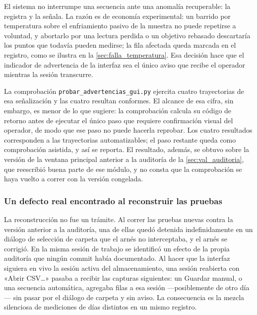 El sistema no interrumpe una secuencia ante una anomalía recuperable:
la registra y la señala. La razón es de economía experimental: un
barrido por temperatura sobre el enfriamiento pasivo de la muestra no
puede repetirse a voluntad, y abortarlo por una lectura perdida o un
objetivo rebasado descartaría los puntos que todavía pueden medirse;
la fila afectada queda marcada en el registro, como se ilustra en la
\cref{sec:falla_temperatura}. Esa decisión hace que el indicador de
advertencia de la interfaz sea el único aviso que recibe el operador
mientras la sesión transcurre.

La comprobación \texttt{probar\_advertencias\_gui.py} ejercita cuatro
trayectorias de esa señalización y las cuatro resultan conformes. El
alcance de esa cifra, sin embargo, es menor de lo que sugiere: la
comprobación calcula su código de retorno antes de ejecutar el único
paso que requiere confirmación visual del operador, de modo que ese
paso no puede hacerla reprobar. Los cuatro resultados corresponden a
las trayectorias automatizables; el paso restante queda como
comprobación asistida, y así se reporta. El resultado, además, se
obtuvo sobre la versión de la ventana principal anterior a la
auditoría de la \cref{sec:val_auditoria}, que reescribió buena parte
de ese módulo, y no consta que la comprobación se haya vuelto a correr
con la versión congelada.


\subsubsection*{Un defecto real encontrado al reconstruir las pruebas}

La reconstrucción no fue un trámite. Al correr las pruebas nuevas
contra la versión anterior a la auditoría, una de ellas quedó detenida
indefinidamente en un diálogo de selección de carpeta que el arnés no
interceptaba, y el arnés se corrigió. En la misma sesión de trabajo se
identificó un efecto de la propia auditoría que ningún commit había
documentado. Al
hacer que la interfaz siguiera en vivo la sesión activa del
almacenamiento, una sesión reabierta con «Abrir CSV…» pasaba a recibir
las capturas siguientes: un Guardar manual, o una secuencia
automática, agregaba filas a esa sesión ---posiblemente de otro día---
sin pasar por el diálogo de carpeta y sin aviso. La consecuencia es la
mezcla silenciosa de mediciones de días distintos en un mismo
registro.

